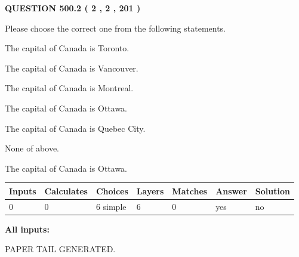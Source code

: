 \documentclass[12pt]{article}
\begin{document}
\vspace{0.2in}
  
{\textbf{\Large{QUESTION
500.2 
 ( 2 , 2 , 201 )
}}}
  
  
Please choose the correct one from the following statements.
 
 
The capital of Canada is Toronto.
 
 
The capital of Canada is Vancouver.
 
 
The capital of Canada is Montreal.
 
 
The capital of Canada is Ottawa.
 
 
The capital of Canada is Quebec City.
 
 
 None of above.
 
 
\noindent{}
 
 
The capital of Canada is Ottawa.
 
 
\noindent{}
 
 
   
   
   
   
\noindent\begin{tabular}{|l|l|l|l|l|l|l|}
 \hline
Inputs & Calculates & Choices & Layers & Matches & Answer & Solution \\ \hline
 0  & 
 0  & 
 6
  simple  
  & 
 6  & 
 0  & 
  yes & 
  no 
  \\ \hline
 \end{tabular}
   
   
   
   
\noindent{}
   
   
   
   
\noindent\vspace{0.1in}\hspace{-0.08in} {\textbf{\Large{All inputs: }}}
   
   
   
   
   
   
 \vspace{0.2in}
 
   
   
\vspace{2.0in} PAPER TAIL GENERATED.
   
\end{document}
